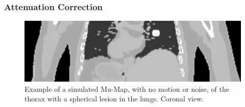             \subsubsection{Attenuation Correction} \label{sec:attenuation_correction}
                \begin{figure}
                    \centering
                    
                    \includegraphics[width=1.0\linewidth]{figures/background_mu_map_example.png}
                    
                    \captionsetup{singlelinecheck=false}
                    \caption{
                        Example of a simulated \gls{Mu-Map}, with no motion or noise, of the thorax with a spherical lesion in the lungs. Coronal view.
                    }
                    \label{fig:combined_pet_ct_mu_map_example}
                \end{figure}
                
